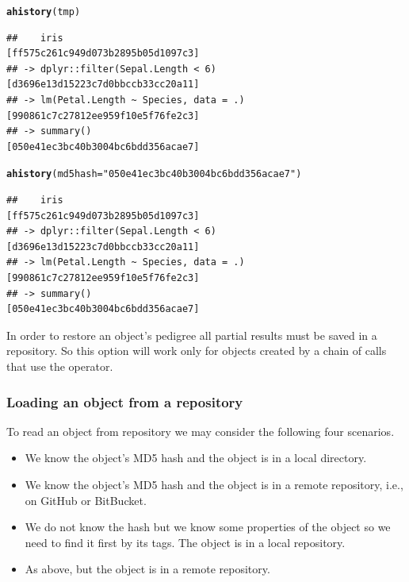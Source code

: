\documentclass[nojss]{jss}\usepackage[]{graphicx}\usepackage[]{color}
\makeatletter
\newcommand{\hlstr}[1]{\textcolor[rgb]{0.192,0.494,0.8}{#1}}%
\newcommand{\hlstd}[1]{\textcolor[rgb]{0.345,0.345,0.345}{#1}}%
\newcommand{\hlkwc}[1]{\textcolor[rgb]{0.333,0.667,0.333}{#1}}%
\newcommand{\hlkwd}[1]{\textcolor[rgb]{0.737,0.353,0.396}{\textbf{#1}}}%
\newenvironment{kframe}{%
 \def\at@end@of@kframe{}%
 \ifinner\ifhmode%
  \def\at@end@of@kframe{\end{minipage}}%
  \begin{minipage}{\columnwidth}%
 \fi\fi%
 \def\FrameCommand##1{\hskip\@totalleftmargin \hskip-\fboxsep
 \colorbox{shadecolor}{##1}\hskip-\fboxsep
     \hskip-\linewidth \hskip-\@totalleftmargin \hskip\columnwidth}%
 \MakeFramed {\advance\hsize-\width
   \@totalleftmargin\z@ \linewidth\hsize
   \@setminipage}}%
 {\par\unskip\endMakeFramed%
 \at@end@of@kframe}
\newenvironment{knitrout}{}{} %
\makeatother
\begin{document}
\begin{knitrout}
\color{fgcolor}\begin{kframe}
\begin{alltt}
\hlkwd{ahistory}\hlstd{(tmp)}
\end{alltt}
\begin{verbatim}
##    iris                                  [ff575c261c949d073b2895b05d1097c3]
## -> dplyr::filter(Sepal.Length < 6)       [d3696e13d15223c7d0bbccb33cc20a11]
## -> lm(Petal.Length ~ Species, data = .)  [990861c7c27812ee959f10e5f76fe2c3]
## -> summary()                             [050e41ec3bc40b3004bc6bdd356acae7]
\end{verbatim}
\begin{alltt}
\hlkwd{ahistory}\hlstd{(}\hlkwc{md5hash} \hlstd{=} \hlstr{"050e41ec3bc40b3004bc6bdd356acae7"}\hlstd{)}
\end{alltt}
\begin{verbatim}
##    iris                                  [ff575c261c949d073b2895b05d1097c3]
## -> dplyr::filter(Sepal.Length < 6)       [d3696e13d15223c7d0bbccb33cc20a11]
## -> lm(Petal.Length ~ Species, data = .)  [990861c7c27812ee959f10e5f76fe2c3]
## -> summary()                             [050e41ec3bc40b3004bc6bdd356acae7]
\end{verbatim}
\end{kframe}
\end{knitrout}


In order to restore an object's pedigree all partial results must be saved in a repository. So this option will work only for objects created by a chain of calls that use the  operator.


\subsubsection{Loading an object from a repository}

To read an object from repository we may consider the following four scenarios.
\begin{itemize}
\item We know the object's MD5 hash and the object is in a local directory.
\item We know the object's MD5 hash and the object is in a remote repository, i.e., on GitHub or BitBucket.
\item We do not know the hash but we know some properties of the object so we need to find it first by its tags. The object is in a local repository.
\item As above, but the object is in a remote repository.
\end{itemize}
\end{document}
